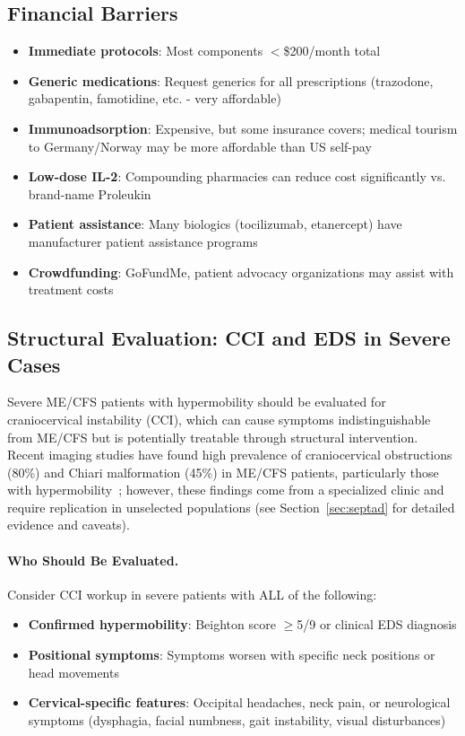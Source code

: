 \subsection{Financial Barriers}

\begin{itemize}
    \item \textbf{Immediate protocols}: Most components $<$\$200/month total
    \item \textbf{Generic medications}: Request generics for all prescriptions (trazodone, gabapentin, famotidine, etc. - very affordable)
    \item \textbf{Immunoadsorption}: Expensive, but some insurance covers; medical tourism to Germany/Norway may be more affordable than US self-pay
    \item \textbf{Low-dose IL-2}: Compounding pharmacies can reduce cost significantly vs. brand-name Proleukin
    \item \textbf{Patient assistance}: Many biologics (tocilizumab, etanercept) have manufacturer patient assistance programs
    \item \textbf{Crowdfunding}: GoFundMe, patient advocacy organizations may assist with treatment costs
\end{itemize}

\subsection{Structural Evaluation: CCI and EDS in Severe Cases}
\label{sec:cci-eds-severe}

Severe ME/CFS patients with hypermobility should be evaluated for craniocervical instability (CCI), which can cause symptoms indistinguishable from ME/CFS but is potentially treatable through structural intervention. Recent imaging studies have found high prevalence of craniocervical obstructions (80\%) and Chiari malformation (45\%) in ME/CFS patients, particularly those with hypermobility~\cite{Bragee2020}; however, these findings come from a specialized clinic and require replication in unselected populations (see Section~\ref{sec:septad} for detailed evidence and caveats).

\paragraph{Who Should Be Evaluated.}
Consider CCI workup in severe patients with ALL of the following:
\begin{itemize}
    \item \textbf{Confirmed hypermobility}: Beighton score $\geq$5/9 or clinical EDS diagnosis
    \item \textbf{Positional symptoms}: Symptoms worsen with specific neck positions or head movements
    \item \textbf{Cervical-specific features}: Occipital headaches, neck pain, or neurological symptoms (dysphagia, facial numbness, gait instability, visual disturbances)
\end{itemize}

